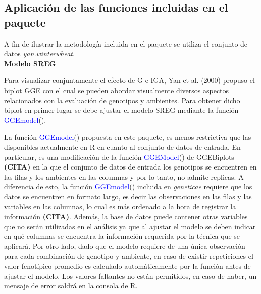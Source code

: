 \subsection{Aplicación de las funciones incluidas en el paquete}

A fin de ilustrar la metodología incluida en el paquete se utiliza el conjunto de datos \emph{yan.winterwheat}.\\

\textbf{Modelo SREG}

Para visualizar conjuntamente el efecto de G e IGA, Yan et al. (2000) propuso el biplot GGE con el cual se pueden abordar visualmente diversos aspectos relacionados con la evaluación de genotipos y ambientes. Para obtener dicho biplot en primer lugar se debe ajustar el modelo SREG mediante la función \textcolor{blue}{GGEmodel}(). 

La función \textcolor{blue}{GGEmodel}() propuesta en este paquete, es menos restrictiva que las disponibles actualmente en R en cuanto al conjunto de datos de entrada. En particular, es una modificación de la función \textcolor{blue}{GGEModel}() de GGEBiplots \textbf{(CITA)} en la que el conjunto de datos de entrada los genotipos se encuentren en las filas y los ambientes en las columnas y por lo tanto, no admite replicas. A diferencia de esto, la función \textcolor{blue}{GGEmodel}() incluida en \emph{geneticae} requiere que los datos se encuentren en formato largo, es decir las observaciones en las filas y las variables en las columnas, lo cual es más ordenado a la hora de registrar la información \textbf{(CITA)}. Además, la base de datos puede contener otras variables que no serán utilizadas en el análisis ya que al ajustar el modelo se deben indicar en qué columnas se encuentra la información requerida por la técnica que se aplicará. Por otro lado, dado que el modelo requiere de una única observación para cada combinación de genotipo y ambiente, en caso de existir repeticiones el valor fenotípico promedio es calculado automáticamente por la función antes de ajustar el modelo. Los valores faltantes no están permitidos, en caso de haber, un mensaje de error saldrá en la consola de R.\\  

